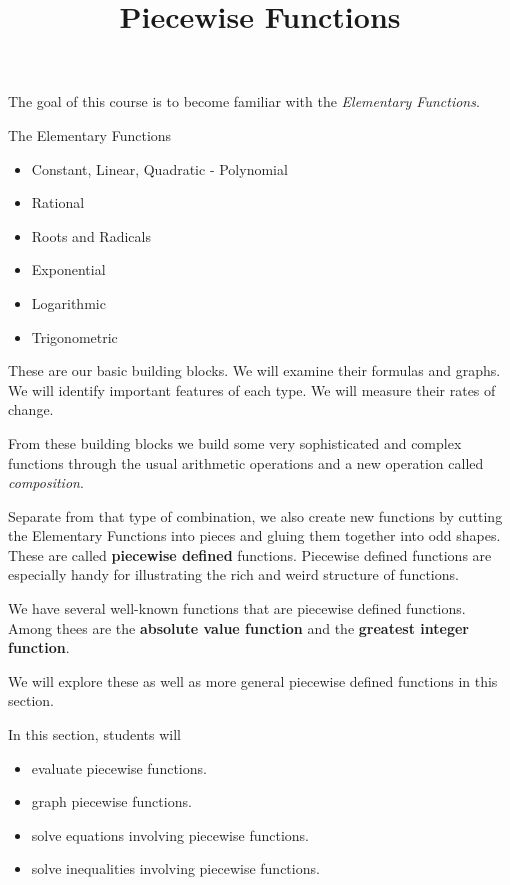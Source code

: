 \documentclass{ximera}
\title{Piecewise Functions}
\begin{document}
\begin{abstract}
\end{abstract}
\maketitle



The goal of this course is to become familiar with the \textit{Elementary Functions}. 


\begin{summary} The Elementary Functions
	\begin{itemize}
		\item Constant, Linear, Quadratic - Polynomial
		\item Rational
		\item Roots and Radicals
		\item Exponential
		\item Logarithmic
		\item Trigonometric
	\end{itemize}
\end{summary}




These are our basic building blocks.  We will examine their formulas and graphs.  We will identify important features of each type. We will measure their rates of change. 

From these building blocks we build some very sophisticated and complex functions through the usual arithmetic operations and a new operation called \textit{composition}. 

Separate from that type of combination, we also create new functions by cutting the Elementary Functions into pieces and gluing them together into odd shapes.   These are called \textbf{piecewise defined} functions.  Piecewise defined functions are especially handy for illustrating the rich and weird structure of functions.


We have several well-known functions that are piecewise defined functions. Among thees are the \textbf{absolute value function} and the \textbf{greatest integer function}.

We will explore these as well as more general piecewise defined functions in this section.










\begin{sectionOutcomes}
In this section, students will 

\begin{itemize}
\item evaluate piecewise functions.
\item graph piecewise functions.
\item solve equations involving piecewise functions.
\item solve inequalities involving piecewise functions.
\end{itemize}
\end{sectionOutcomes}
\end{document}
